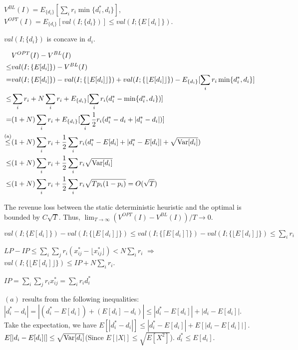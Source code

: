 $V^{BL}(I) = E_{\{d_{i}\}}[\sum_{i} r_{i} \min\{d_{i}^{*}, d_{i}\}]$, $V^{OPT}(I) = E_{\{d_{i}\}} [val(I; \{d_{i}\})] \leq val(I; \{E[d_{i}]\})$.

$val(I; \{d_{i}\})$ is concave in $d_{i}$.

\begin{align*}
   & V^{OPT}(I) - V^{BL}(I) \\
\leq & val(I; \{E[d_{i}]\}) - V^{BL}(I) \\
= & val(I; \{E[d_{i}]\}) - val(I; \{\lfloor E[d_{i}]\rfloor\}) + val(I; \{\lfloor E[d_{i}]\rfloor\}) - E_{\{d_{i}\}}[\sum_{i} r_{i} \min\{d_{i}^{*}, d_{i}\}] \\
\leq & \sum_{i} r_{i} + N \sum_{i} r_i + E_{\{d_{i}\}}[\sum_{i} r_{i} (d_{i}^{*} - \min\{d_{i}^{*}, d_{i}\})] \\
= & (1+N) \sum_{i} r_{i} + E_{\{d_{i}\}}[\sum_{i} \frac{1}{2} r_{i} (d_{i}^{*} - d_{i} + |d_{i}^{*} - d_{i}|)] \\
\overset{\text{(a)}}{\leq} & (1+N) \sum_{i} r_{i} + \frac{1}{2} \sum_{i} r_{i} (d_{i}^{*} - E[d_{i}] + |d_{i}^{*} - E[d_{i}]| + \sqrt{\operatorname{{Var}}[d_{i}]}) \\
\leq & (1+N) \sum_{i} r_{i} + \frac{1}{2} \sum_{i} r_{i} \sqrt{\operatorname{{Var}}[d_{i}]} \\
\leq & (1+N) \sum_{i} r_{i} + \frac{1}{2} \sum_{i} r_{i} \sqrt{T p_{i} (1- p_{i})} = O(\sqrt{T})
\end{align*}

The revenue loss between the static deterministic heuristic and the optimal is bounded by $C \sqrt{T}$.
Thus, $\lim_{T \to \infty} (V^{OPT}(I) - V^{BL}(I))/T \to 0$.

$val(I; \{E[d_{i}]\}) - val(I; \{\lfloor E[d_{i}]\rfloor\}) \leq val(I; \{\lceil E[d_{i}]\rceil\}) - val(I; \{\lfloor E[d_{i}]\rfloor\}) \leq \sum_{i} r_{i}$


$LP -IP \leq \sum_{i} \sum_{j} r_{i} (x_{ij}^{*} - \lfloor x_{ij}^{*} \rfloor) < N \sum_{i} r_i$ $\Rightarrow$ $val(I; \{\lfloor E[d_{i}]\rfloor\}) \leq IP + N \sum_{i} r_i$.

$IP = \sum_{i} \sum_{j} r_{i} x_{ij}^{*} = \sum_{i} r_{i} d_{i}^{*}$

$(a)$ results from the following inequalities: $|d_{i}^{*} -d_{i}| = |(d_{i}^{*}-E[d_{i}]) + (E[d_{i}] -d_{i})| \leq |d_{i}^{*}-E[d_{i}]| + |d_{i} - E[d_{i}]|$. Take the expectation, we have $E[|d_{i}^{*} -d_{i}|]\leq |d_{i}^{*}-E[d_{i}]| + E[|d_{i} - E[d_{i}]|]$. $E[|d_{i} - E[d_{i}]|] \leq \sqrt{\operatorname{{Var}}[d_{i}]}$(Since $E[|X|] \leq \sqrt{E[X^{2}]}$). $d_{i}^{*} \leq E[d_{i}]$.

